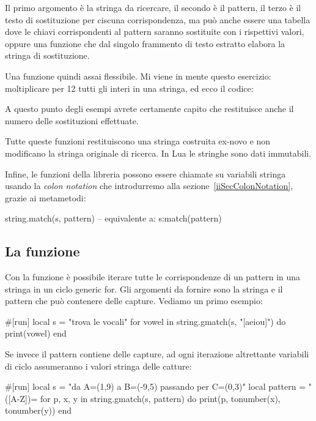Il primo argomento è la stringa da ricercare, il secondo è il pattern, il terzo
è il testo di sostituzione per ciscuna corrispondenza, ma può anche essere una
tabella dove le chiavi corrispondenti al pattern saranno sostituite con i
rispettivi valori, oppure una funzione che dal singolo frammento di testo
estratto elabora la stringa di sostituzione.

Una funzione quindi assai flessibile. Mi viene in mente questo esercizio:
moltiplicare per 12 tutti gli interi in una stringa, ed ecco il codice:

A questo punto degli esempi avrete certamente capito che  restituisce
anche il numero delle sostituzioni effettuate.

Tutte queste funzioni restituiscono una stringa costruita ex-novo e non
modificano la stringa originale di ricerca. In Lua le stringhe sono dati
immutabili.

Infine, le funzioni della libreria  possono essere chiamate su
variabili stringa usando la \emph{colon notation} che introdurremo alla
sezione~\ref{iiSecColonNotation}, grazie ai metametodi:
\begin{lines}
string.match(s, pattern) -- equivalente a:
s:match(pattern)
\end{lines}


\subsection{La funzione }

Con la funzione  è possibile iterare
tutte le corrispondenze di un pattern in una stringa in un ciclo generic for.
Gli argomenti da fornire sono la stringa e il pattern che può contenere delle
capture. Vediamo un primo esempio:
\begin{lines}
#[run]
local s = "trova le vocali"
for vowel in string.gmatch(s, "[aeiou]") do
    print(vowel)
end
\end{lines}

Se invece il pattern contiene delle capture, ad ogni iterazione altrettante
variabili di ciclo assumeranno i valori stringa delle catture:
\begin{lines}
#[run]
local s = "da A=(1,9) a B=(-9,5) passando per C=(0,3)"
local pattern = "([A-Z])=%
for p, x, y in string.gmatch(s, pattern) do
    print(p, tonumber(x), tonumber(y))
end
\end{lines}


